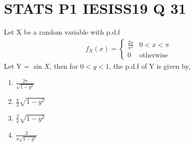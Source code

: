 \documentclass[journal,12pt,twocolumn]{IEEEtran}
\begin{document}
\section*{STATS P1 IESISS19 Q 31}
Let X be a random variable with p.d.f
\begin{align}
    f_{X}(x)=\begin{cases} 
            \frac{2x}{\pi^2}  &  0<x<\pi\\
            0 & \text{otherwise}
            \end{cases} 
\end{align}
Let Y = $\sin{X}$, then for $0<y<1$, the p.d.f of Y is given by,\\
\begin{enumerate}[label = (\Alph*)]
    \item  $\frac{2\pi}{\sqrt{1-y^2}}$\\
    \item  $\frac{\pi}{2}\sqrt{1-y^2}$\\
    \item  $\frac{2}{\pi}\sqrt{1-y^2}$\\
    \item  $\frac{2}{\pi\sqrt{1-y^2}}$
\end{enumerate}
\end{document}
